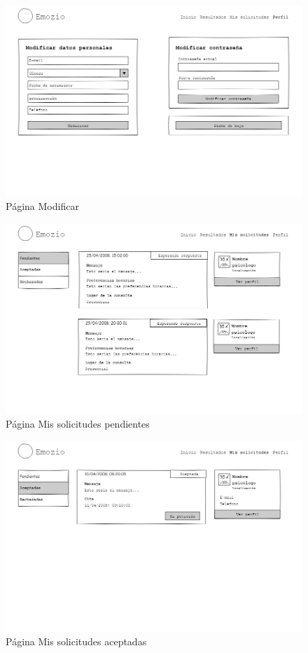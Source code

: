 \begin{figure}[htbp] 
    \centering
    \includegraphics[width=1\textwidth]{figuras/mockup_pacientes/modificar.png}
    \caption{Página Modificar}
\end{figure}	

\begin{figure}[htbp] 
    \centering
    \includegraphics[width=1\textwidth]{figuras/mockup_pacientes/mailpendientes.png}
    \caption{Página Mis solicitudes pendientes}
\end{figure}	

\begin{figure}[htbp] 
    \centering
    \includegraphics[width=1\textwidth]{figuras/mockup_pacientes/mailaceptadas.png}
    \caption{Página Mis solicitudes aceptadas}
\end{figure}	

